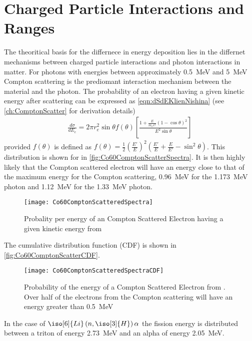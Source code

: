 \section{Charged Particle Interactions and Ranges}

The theoritical basis for the differnece in energy deposition lies in the differnet mechanisms between charged particle interactions and photon interactions in matter.
For photons with energies between approximately \SI{0.5}{\MeV} and \SI{5}{\MeV} Compton scattering is the prediomant interaction mechanism between the material and the photon.
The probability of an electron having a given kinetic energy after scattering can be expressed as \autoref{eqn:dSdEKlienNishina} (see \autoref{ch:ComptonScatter} for derivation details)
\begin{align}
  \label{eqn:dSdEKleinNishina}
\frac{d\sigma}{dE_e} = 2\pi r_e^2 \sin \theta f(\theta)\left [ \frac{1+\frac{E}{m_e c^2}\left(1-\cos\theta \right)^2}{E^2 \sin \theta} \right ]
\end{align}
provided  $f(\theta)$ is defined as $f(\theta) = \frac{1}{2}\left(\frac{E'}{E}\right)^2 \left(\frac{E'}{E} + \frac{E}{E'}-\sin^2\theta\right)$.
This distribution is shown for  in \autoref{fig:Co60ComptonScatterSpectra}.
It is then highly likely that the Compton scattered electron will have an energy close to that of the maximum energy for the Compton scattering, \SI{0.96}{\MeV} for the \SI{1.173}{\MeV} photon and \SI{1.12}{\MeV} for the \SI{1.33}{\MeV} photon.
\begin{figure}
  \centering
  \texttt{[image: Co60ComptonScatteredSpectra]}
  \caption[ Compton Scattered Spectra]{Probality per energy of an Compton Scattered Electron having a given kinetic energy from }
  \label{fig:Co60ComptonScatterSpectra}
\end{figure}
The cumulative distribution function (CDF) is shown in \autoref{fig:Co60ComptonScatterCDF}.
\begin{figure}
  \centering
  \texttt{[image: Co60ComptonScatteredSpectraCDF]}
  \caption[ Compton Scattered CDF]{Probability of the energy of a Compton Scattered Electron from . Over half of the electrons from the Compton scattering will have an energy greater than \SI{0.5}{\MeV}}
  \label{fig:Co60ComptonScatterCDF}
\end{figure}
In the case of $\iso[6]{Li}\left(n,\iso[3]{H}\right)\alpha$ the fission energy is distributed between a triton of energy \SI{2.73}{\mega\eV} and an alpha of energy \SI{2.05}{\mega\eV}.
